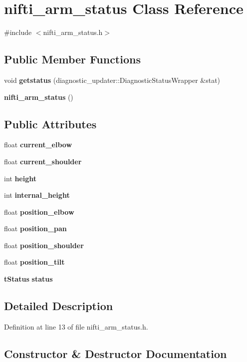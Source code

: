\section{nifti\-\_\-arm\-\_\-status \-Class \-Reference}
\label{classnifti__arm__status}


{\ttfamily \#include $<$nifti\-\_\-arm\-\_\-status.\-h$>$}

\subsection*{\-Public \-Member \-Functions}
\begin{DoxyCompactItemize}
\item 
void {\bf getstatus} (diagnostic\-\_\-updater\-::\-Diagnostic\-Status\-Wrapper \&stat)
\item 
{\bf nifti\-\_\-arm\-\_\-status} ()
\end{DoxyCompactItemize}
\subsection*{\-Public \-Attributes}
\begin{DoxyCompactItemize}
\item 
float {\bf current\-\_\-elbow}
\item 
float {\bf current\-\_\-shoulder}
\item 
int {\bf height}
\item 
int {\bf internal\-\_\-height}
\item 
float {\bf position\-\_\-elbow}
\item 
float {\bf position\-\_\-pan}
\item 
float {\bf position\-\_\-shoulder}
\item 
float {\bf position\-\_\-tilt}
\item 
{\bf t\-Status} {\bf status}
\end{DoxyCompactItemize}


\subsection{\-Detailed \-Description}


\-Definition at line 13 of file nifti\-\_\-arm\-\_\-status.\-h.



\subsection{\-Constructor \& \-Destructor \-Documentation}
